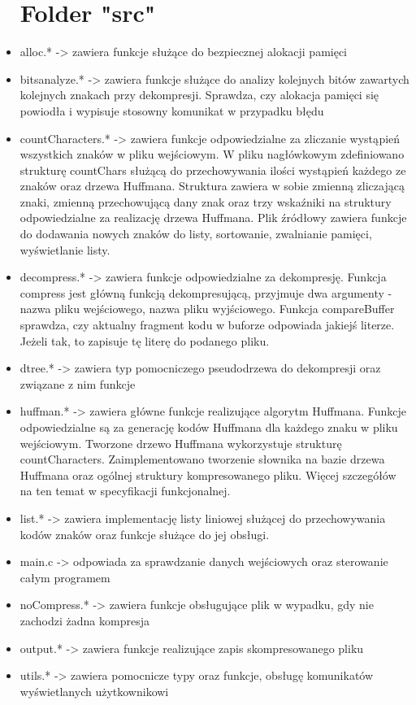 \documentclass[]{article}
\begin{document}
\begin{itemize}
\section{Folder "src"}\label{header-n231}
\item
alloc.* -> zawiera funkcje służące do bezpiecznej alokacji pamięci
\item
bits\textunderscore analyze.* -> zawiera funkcje służące do analizy kolejnych bitów zawartych kolejnych znakach przy dekompresji. Sprawdza, czy alokacja pamięci się powiodła i wypisuje stosowny komunikat w przypadku błędu
\item
countCharacters.* -> zawiera funkcje odpowiedzialne za zliczanie wystąpień wszystkich znaków w pliku wejściowym. W pliku nagłówkowym zdefiniowano strukturę countChars służącą do przechowywania ilości wystąpień każdego ze znaków oraz drzewa Huffmana. Struktura zawiera w sobie zmienną zliczającą znaki, zmienną przechowującą dany znak oraz trzy wskaźniki na struktury odpowiedzialne za realizację drzewa Huffmana. Plik źródłowy zawiera funkcje do dodawania nowych znaków do listy, sortowanie, zwalnianie pamięci, wyświetlanie listy.
\item
decompress.* -> zawiera funkcje odpowiedzialne za dekompresję. Funkcja compress jest główną funkcją dekompresującą, przyjmuje dwa argumenty - nazwa pliku wejściowego, nazwa pliku wyjściowego. Funkcja compareBuffer sprawdza, czy aktualny fragment kodu w buforze odpowiada jakiejś literze. Jeżeli tak, to zapisuje tę literę do podanego pliku.
\item
dtree.* -> zawiera typ pomocniczego pseudodrzewa do dekompresji oraz związane z nim funkcje
\item
huffman.* -> zawiera główne funkcje realizujące algorytm Huffmana. Funkcje odpowiedzialne są za generację kodów Huffmana dla każdego znaku w pliku wejściowym. Tworzone drzewo Huffmana wykorzystuje strukturę countCharacters. Zaimplementowano tworzenie słownika na bazie drzewa Huffmana oraz ogólnej struktury kompresowanego pliku.  Więcej szczegółów na ten temat w specyfikacji funkcjonalnej.
\item
list.* -> zawiera implementację listy liniowej służącej do przechowywania kodów znaków oraz funkcje służące do jej obsługi.
\item
main.c -> odpowiada za sprawdzanie danych wejściowych oraz sterowanie całym programem
\item
noCompress.* -> zawiera funkcje obsługujące plik w wypadku, gdy nie zachodzi żadna kompresja
\item
output.* -> zawiera funkcje realizujące zapis skompresowanego pliku
\item
utils.* -> zawiera pomocnicze typy oraz funkcje, obsługę komunikatów wyświetlanych użytkownikowi

\end{itemize}
\end{document}
